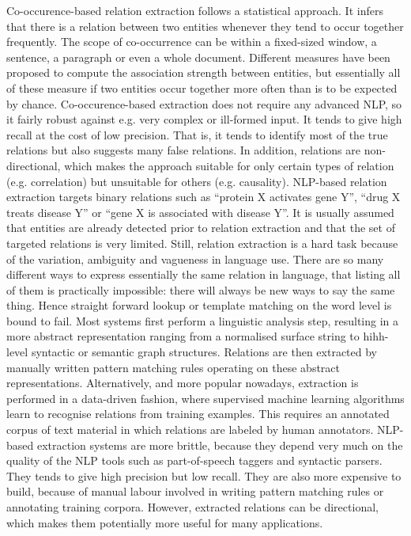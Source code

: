 Co-occurence-based relation extraction follows a statistical approach. It infers that there is a relation between two entities whenever they tend to occur together frequently. 
The scope of co-occurrence can be within a fixed-sized window, a sentence, a paragraph or even a whole document. 
Different measures have been proposed to compute the association strength between entities, but essentially all of these measure if two entities occur together more often than is to be expected by chance. 
Co-occurence-based extraction does not require any advanced NLP, so it fairly robust against e.g. very complex or ill-formed input. It tends to give high recall at the cost of low precision. 
That is, it tends to identify most of the true relations but also suggests many false relations. 
In addition, relations are non-directional, which makes the approach suitable for only certain types of relation (e.g. correlation) but unsuitable for others (e.g. causality).
NLP-based relation extraction targets binary relations such as ``protein X activates gene Y'', ``drug X treats disease Y'' or ``gene X is associated with disease Y''.
It is usually assumed that entities are already detected prior to relation extraction and that the set of targeted relations is very limited.
Still, relation extraction is a hard task because of the variation, ambiguity and vagueness in language use.
There are so many different ways to express essentially the same relation in language, that listing all of them is practically impossible: there will always be new ways to say the same thing.
Hence straight forward lookup or template matching on the word level is bound to fail.
Most systems first perform a linguistic analysis step, resulting in a more abstract representation ranging from a normalised surface string to hihh-level syntactic or semantic graph structures. 
Relations are then extracted by manually written pattern matching rules operating on these abstract representations.
Alternatively, and more popular nowadays, extraction is performed in a data-driven fashion, where supervised machine learning algorithms learn to recognise relations from training examples.
This requires an annotated corpus of text material in which relations are labeled by human annotators.
NLP-based extraction systems are more brittle, because they depend very much on the quality of the NLP tools such as part-of-speech taggers and syntactic parsers.
They tends to give high precision but low recall.
They are also more expensive to build, because of manual labour involved in writing pattern matching rules or annotating training corpora.
However, extracted relations can be directional, which makes them potentially more useful for many applications. 

